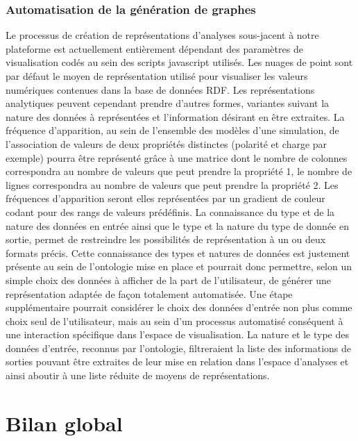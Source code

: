 \subsubsection*{Automatisation de la génération de graphes}

Le processus de création de représentations d'analyses sous-jacent à notre plateforme est actuellement entièrement dépendant des paramètres de visualisation codés au sein des scripts javascript utilisés. Les nuages de point sont par défaut le moyen de représentation utilisé pour visualiser les valeurs numériques contenues dans la base de données RDF. Les représentations analytiques peuvent cependant prendre d'autres formes, variantes suivant la nature des données à représentées et l'information désirant en être extraites. 
La fréquence d'apparition, au sein de l'ensemble des modèles d'une simulation, de l'association de valeurs de deux propriétés distinctes (polarité et charge par exemple) pourra être représenté grâce à une matrice dont le nombre de colonnes correspondra au nombre de valeurs que peut prendre la propriété 1, le nombre de lignes correspondra au nombre de valeurs que peut prendre la propriété 2. Les fréquences d'apparition seront elles représentées par un gradient de couleur codant pour des rangs de valeurs prédéfinis.
La connaissance du type et de la nature des données en entrée ainsi que le type et la nature du type de donnée en sortie, permet de restreindre les possibilités de représentation à un ou deux formats précis. Cette connaissance des types et natures de données est justement présente au sein de l'ontologie mise en place et pourrait donc permettre, selon un simple choix des données à afficher de la part de l'utilisateur, de générer une représentation adaptée de façon totalement automatisée. 
Une étape supplémentaire pourrait considérer le choix des données d'entrée non plus comme choix seul de l'utilisateur, mais au sein d'un processus automatisé conséquent à une interaction spécifique dans l'espace de visualisation. La nature et le type des données d'entrée, reconnus par l'ontologie, filtreraient la liste des informations de sorties pouvant être extraites de leur mise en relation dans l'espace d'analyses et ainsi aboutir à une liste réduite de moyens de représentations.

\section*{Bilan global}

